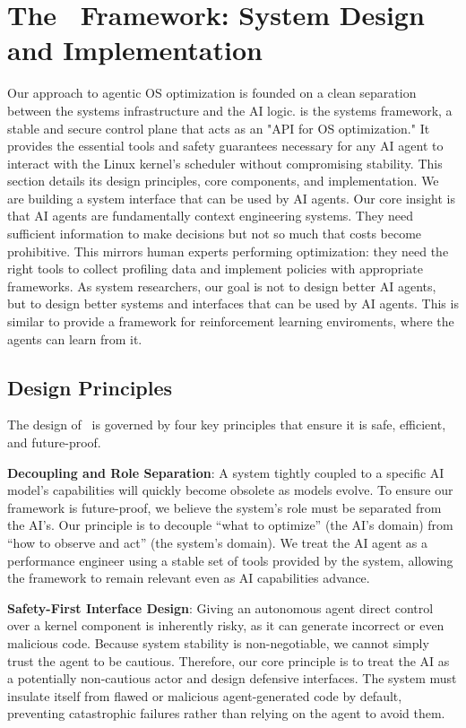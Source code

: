 \section{The \sys\ Framework: System Design and Implementation}
\label{sec:schedcp_framework}

Our approach to agentic OS optimization is founded on a clean separation between the systems infrastructure and the AI logic. \textbf{\sys} is the systems framework, a stable and secure control plane that acts as an "API for OS optimization." It provides the essential tools and safety guarantees necessary for any AI agent to interact with the Linux kernel's scheduler without compromising stability. This section details its design principles, core components, and implementation.
We are building a system interface that can be used by AI agents. Our core insight is that AI agents are fundamentally context engineering systems. They need sufficient information to make decisions but not so much that costs become prohibitive. This mirrors human experts performing optimization: they need the right tools to collect profiling data and implement policies with appropriate frameworks. As system researchers, our goal is not to design better AI agents, but to design better systems and interfaces that can be used by AI agents. This is similar to provide a framework for reinforcement learning enviroments, where the agents can learn from it.

\subsection{Design Principles}
The design of \sys\ is governed by four key principles that ensure it is safe, efficient, and future-proof.

\textbf{Decoupling and Role Separation}: A system tightly coupled to a specific AI model's capabilities will quickly become obsolete as models evolve. To ensure our framework is future-proof, we believe the system's role must be separated from the AI's. Our principle is to decouple ``what to optimize'' (the AI's domain) from ``how to observe and act'' (the system's domain). We treat the AI agent as a performance engineer using a stable set of tools provided by the system, allowing the framework to remain relevant even as AI capabilities advance.

\textbf{Safety-First Interface Design}: Giving an autonomous agent direct control over a kernel component is inherently risky, as it can generate incorrect or even malicious code. Because system stability is non-negotiable, we cannot simply trust the agent to be cautious. Therefore, our core principle is to treat the AI as a potentially non-cautious actor and design defensive interfaces. The system must insulate itself from flawed or malicious agent-generated code by default, preventing catastrophic failures rather than relying on the agent to avoid them.

